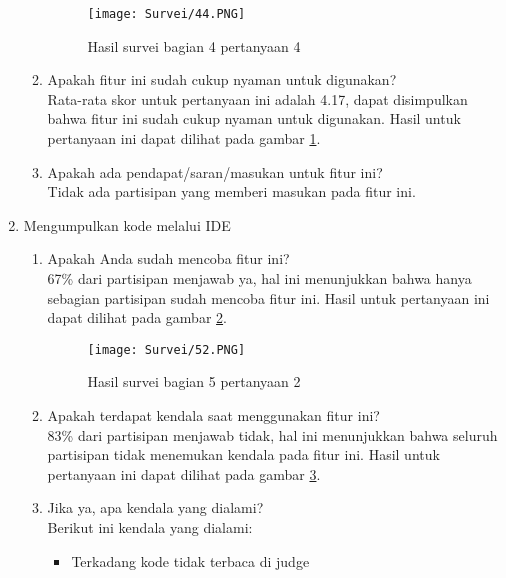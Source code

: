 \begin{enumerate}
\begin{enumerate}
        \begin{figure}[H]
        	\centering  
        	\texttt{[image: Survei/44.PNG]}  
        	\caption{Hasil survei bagian 4 pertanyaan 4}
        	\label{fig:5:survei44} 
        \end{figure}
        \item Apakah fitur ini sudah cukup nyaman untuk digunakan? \\ Rata-rata skor untuk pertanyaan ini adalah 4.17, dapat disimpulkan bahwa fitur ini sudah cukup nyaman untuk digunakan. Hasil untuk pertanyaan ini dapat dilihat pada gambar \ref{fig:5:survei44}.
        \item Apakah ada pendapat/saran/masukan untuk fitur ini? \\ Tidak ada partisipan yang memberi masukan pada fitur ini.
    \end{enumerate}
    \item Mengumpulkan kode melalui IDE
        \begin{enumerate}
        \begin{figure}[H]
        	\centering  
        	\texttt{[image: Survei/51.PNG]}  
        	\caption{Hasil survei bagian 5 pertanyaan 1}
        	\label{fig:5:survei51} 
        \end{figure}
        \item Apakah Anda sudah mencoba fitur ini? \\ 67\% dari partisipan menjawab ya, hal ini menunjukkan bahwa hanya sebagian partisipan sudah mencoba fitur ini. Hasil untuk pertanyaan ini dapat dilihat pada gambar \ref{fig:5:survei51}.
        \begin{figure}[H]
        	\centering  
        	\texttt{[image: Survei/52.PNG]}  
        	\caption{Hasil survei bagian 5 pertanyaan 2}
        	\label{fig:5:survei52} 
        \end{figure}
        \item Apakah terdapat kendala saat menggunakan fitur ini? \\ 83\% dari partisipan menjawab tidak, hal ini menunjukkan bahwa seluruh partisipan tidak menemukan kendala pada fitur ini. Hasil untuk pertanyaan ini dapat dilihat pada gambar \ref{fig:5:survei52}.
        \item Jika ya, apa kendala yang dialami? \\ Berikut ini kendala yang dialami:
        \begin{itemize}
            \item Terkadang kode tidak terbaca di judge

\end{itemize}
\end{enumerate}
\end{enumerate}
